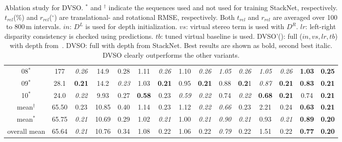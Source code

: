 \documentclass[runningheads]{llncs}
\begin{document}
\begin{table}[tb]
\begin{tabular}{c|cc|cc|cc|cc|cc|cc|cc}
		08$^\ast$   & 177 & \textit{0.26} & 14.9 & 0.28 & 1.11 & \textit{0.26} 
		& 1.10 & 
		\textit{0.26}&\textit{1.05} 
		& 
		\textit{0.26}& \textit{1.05} & \textit{0.26}& \textbf{1.03} & 
		\textbf{0.25}
		\\
		09$^\ast$   & 28.1 & \textbf{0.21} & 14.2 & \textit{0.23} & 1.03 & 
		\textbf{0.21} & 0.95 & 
		\textbf{0.21}&0.88
		& 
		\textbf{0.2}1& \textit{0.87} & \textbf{0.21}& \textbf{0.83} & 
		\textbf{0.21}
		\\
		10$^\ast$   & 24.0 & \textit{0.22} & 9.93 & 0.27 & \textbf{0.58} & 0.23 
		&\textit{0.59} & 
		\textit{0.22}& 0.74 & \textit{0.22}& \textbf{0.68} & \textbf{0.21}& 
		0.74 & \textbf{0.21}
		\\ 
		\hline
		\hline
		mean$^\dagger$ & 65.50 & 0.23 & 10.85 & 0.40 & 1.14 & 0.23& 1.12 & 
		\textit{0.22}&\textit{0.66} & 
		0.23& 2.21 & 0.24& 
		\textbf{0.63} & 
		\textbf{0.21}
		\\
		mean$^\ast$ & 65.75 & \textit{0.21} & 10.69 & 0.29 & 1.02 & 
		\textit{0.21}& 1.00 & 
		\textit{0.21}&\textit{0.90} & 
		\textit{0.21}&0.93 & \textit{0.21}& 
		\textbf{0.89} & 
		\textbf{0.20}
		\\
		overall mean & 65.64 & \textit{0.21} & 10.76 & 0.34 & 1.08 & 0.22& 1.06 
		& 
		0.22&\textit{0.79} & 
		0.22& 1.51 & 0.22& 
		\textbf{0.77} & 
		\textbf{0.20}
		\\
	\end{tabular}
	\caption{Ablation study for DVSO. $^\ast$ and $^\dagger$ indicate the 
	sequences 
	used and not used for training StackNet, respectively. $t_{rel}$($\%$) and 
		$r_{rel}$($^\circ$) are 
		translational-
		 and rotational RMSE, respectively. Both $t_{rel}$ and 
		$r_{rel}$
		are
		averaged over 100 to 800\,m intervals. $in$: $D^{L}$ is used for 
		depth initialization. $vs$: virtual stereo term is used with $D^{R}$. 
		$lr$: left-right disparity consistency is checked using predictions. 
		$tb$: tuned virtual baseline is used. 
		DVSO'(\cite{godard2016unsupervised}): full ($in,vs,lr,tb$) with 
		depth 
		from~\cite{godard2016unsupervised}. DVSO: full with 
		depth from StackNet. Best results are shown as bold, 
		second 
		best italic. DVSO clearly outperforms the other variants.}
	\label{tab:diff_settings}
\end{table}
\end{document}
